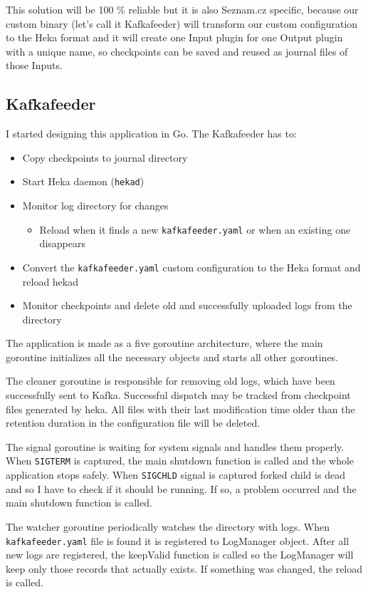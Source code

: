 This solution will be 100 \% reliable but it is also Seznam.cz specific, because our custom binary (let’s call it Kafkafeeder) will transform our custom configuration to the Heka format  and it will create one Input plugin for one Output plugin with a unique name, so checkpoints can be saved and reused as journal files of those Inputs.
 
\subsection{Kafkafeeder}
I started designing this application in Go. The Kafkafeeder has to:
\begin{itemize} 
  \item	Copy checkpoints to journal directory
  \item	Start Heka daemon (\lstinline{hekad})
  \item	Monitor log directory for changes
    \begin{itemize}
      \item Reload when it finds a new \lstinline{kafkafeeder.yaml} or when an existing one disappears
    \end{itemize}
  \item	Convert the \lstinline{kafkafeeder.yaml} custom configuration to the Heka format and reload hekad 
  \item	Monitor checkpoints and delete old and successfully uploaded logs from the directory
\end{itemize}

The application is made as a five goroutine architecture, where the main goroutine initializes all the necessary objects and starts all other goroutines.

The cleaner goroutine is responsible for removing old logs, which have been successfully sent to Kafka. Successful dispatch may be tracked from checkpoint files generated by heka. All files with their last modification time older than the retention duration in the configuration file will be deleted.

The signal goroutine is waiting for system signals and handles them properly. When \lstinline{SIGTERM} is captured, the main shutdown function is called and the whole application stops safely. When \lstinline{SIGCHLD} signal is captured forked child is dead and so I have to check if it should be running. If so, a problem occurred and the main shutdown function is called.

The watcher goroutine periodically watches the directory with logs. When \lstinline{kafkafeeder.yaml} file is found it is registered to LogManager object. After all new logs are registered, the keepValid function is called so the LogManager will keep only those records that actually exists. If something was changed, the reload is called.


